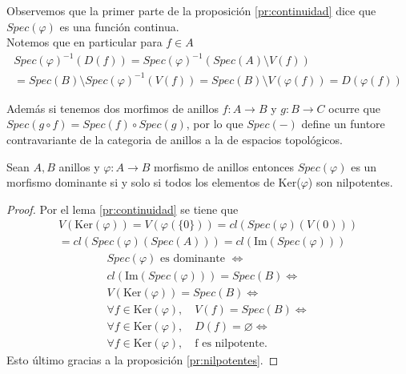 \documentclass[14pt]{extarticle}
\begin{document}
\begin{observacion}{}{}
    Observemos que la primer parte de 
    la proposición \ref{pr:continuidad} dice que $Spec(\varphi)$
    es una función continua.\\
    Notemos que en particular para $f\in A$
    \begin{multline*}
        Spec(\varphi)^{-1}(D(f))
        = Spec(\varphi)^{-1}(Spec(A)\setminus V(f))\\
        = Spec(B)\setminus Spec(\varphi)^{-1}(V(f))
        = Spec(B)\setminus V(\varphi(f))
        = D(\varphi(f))
    \end{multline*}

    Además si tenemos dos morfimos de anillos
    $f:A\rightarrow B$ y $g:B\rightarrow C$ 
    ocurre que $Spec(g\circ f)= Spec(f)\circ Spec(g)$,
    por lo que $Spec(-)$ define un funtore
    contravariante de la categoria de anillos a la de 
    espacios topológicos.
\end{observacion}

\begin{proposicion}{}{}
    Sean $A, B$ anillos y $\varphi:A \rightarrow B$ 
    morfismo de anillos entonces $Spec(\varphi)$ es un
    morfismo dominante si y solo si todos los elementos
    de Ker($\varphi$) son nilpotentes.
\end{proposicion}
\begin{proof}
    Por el lema \ref{pr:continuidad} se tiene que
    \begin{multline*}
        V(\mbox{Ker}(\varphi))=V(\varphi(\{0\}))
        =cl(Spec(\varphi)(V(0)))\\
        =cl(Spec(\varphi)(Spec(A)))
        =cl(\mbox{Im}(Spec(\varphi)))
    \end{multline*}
    \begin{align*}
        Spec(\varphi) \mbox{ es dominante }\iff\\
        cl(\mbox{Im}(Spec(\varphi))) = Spec(B) \iff \\
        V(\mbox{Ker}(\varphi)) = Spec(B) \iff\\
        \forall f\in \mbox{Ker}(\varphi),\quad V(f)=Spec(B)\iff \\
        \forall f\in \mbox{Ker}(\varphi),\quad D(f)=\varnothing \iff \\
        \forall f\in \mbox{Ker}(\varphi),\quad \mbox{f es nilpotente}.
    \end{align*}
    Esto último gracias a la proposición \ref{pr:nilpotentes}.
\end{proof}
\end{document}

